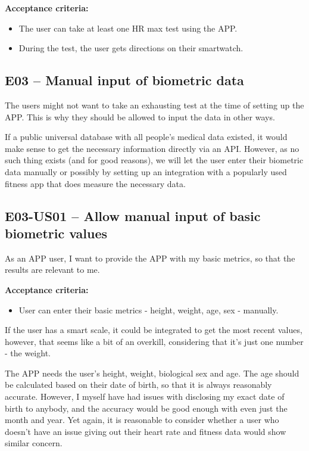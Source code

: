\textbf{Acceptance criteria:}
\begin{itemize}
    \item The user can take at least one HR max test using the APP.
    \item During the test, the user gets directions on their smartwatch.
\end{itemize}%
\subsection*{E03 -- Manual input of biometric data}
The users might not want to take an exhausting test at the time of setting up the APP.
This is why they should be allowed to input the data in other ways.

If a public universal database with all people's medical data existed, it would make sense to get the necessary information directly via an API.
However, as no such thing exists (and for good reasons), we will let the user enter their biometric data manually or possibly by setting up an integration with a popularly used fitness app that does measure the necessary data.

\subsection*{E03-US01 -- Allow manual input of basic biometric values}
As an APP user, I want to provide the APP with my basic metrics, so that the results are relevant to me.

\textbf{Acceptance criteria:}
\begin{itemize}
    \item User can enter their basic metrics - height, weight, age, sex - manually.
\end{itemize}

If the user has a smart scale, it could be integrated to get the most recent values, however, that seems like a bit of an overkill, considering that it's just one number - the weight.

The APP needs the user's height, weight, biological sex and age.
The age should be calculated based on their date of birth, so that it is always reasonably accurate.
However, I myself have had issues with disclosing my exact date of birth to anybody, and the accuracy would be good enough with even just the month and year.
Yet again, it is reasonable to consider whether a user who doesn't have an issue giving out their heart rate and fitness data would show similar concern.

